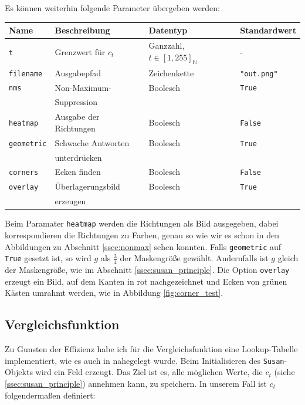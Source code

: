 \documentclass[a4paper, 11pt]{report}
\theoremstyle{definition}
\begin{document}
		Es können weiterhin folgende Parameter übergeben werden:
		\begin{center}
			\begin{tabular}{|l|l|l|l|}
				\hline
				\textbf{Name} 		& \textbf{Beschreibung} 	& \textbf{Datentyp}							& \textbf{Standardwert}	\\
				\hline
				\texttt{t}			& Grenzwert	für $c_t$		& Ganzzahl, $t \in [1,255]_\mathbb{N}$		& -\\
				\hline
				\texttt{filename}	& Ausgabepfad				& Zeichenkette								& \texttt{"{}out.png"}\\
				\hline
				\texttt{nms}		& Non-Maximum-				& Boolesch									& \texttt{True}\\
									& Suppression & & \\
				\hline
				\texttt{heatmap}	& Ausgabe der Richtungen 	& Boolesch									& \texttt{False}\\
				\hline
				\texttt{geometric}	& Schwache Antworten 		& Boolesch 									& \texttt{True} \\
									& unterdrücken & & \\
				\hline
				\texttt{corners}	& Ecken finden				& Boolesch									& \texttt{False} \\
				\hline
				\texttt{overlay}	& Überlagerungsbild 		& Boolesch									& \texttt{True} \\
									& erzeugen & & \\
				\hline
			\end{tabular}
		\end{center}

		Beim Paramater \texttt{heatmap} werden die Richtungen als Bild ausgegeben, dabei korrespondieren die Richtungen zu Farben, genau so wie wir es schon in den Abbildungen zu Abschnitt \ref{ssec:nonmax} sehen konnten.
		Falls \texttt{geometric} auf \texttt{True} gesetzt ist, so wird $g$ als $\frac{3}{4}$ der Maskengröße gewählt. Andernfalls ist $g$ gleich der Maskengröße, wie im Abschnitt \ref{ssec:susan_principle}.
		Die Option \texttt{overlay} erzeugt ein Bild, auf dem Kanten in rot nachgezeichnet und Ecken von grünen Kästen umrahmt werden, wie in Abbildung \ref{fig:corner_test}.

			\subsection{Vergleichsfunktion}
				Zu Gunsten der Effizienz habe ich für die Vergleichsfunktion eine Lookup-Tabelle implementiert, wie es auch in \cite{SUSAN} nahegelegt wurde. Beim Initialisieren des \texttt{Susan}-Objekts wird ein Feld erzeugt. Das Ziel ist es, alle möglichen Werte, die $c_t$ (siehe \ref{ssec:susan_principle}) annehmen kann, zu speichern.
				In unserem Fall ist $c_t$ folgendermaßen definiert:
				
\end{document}
